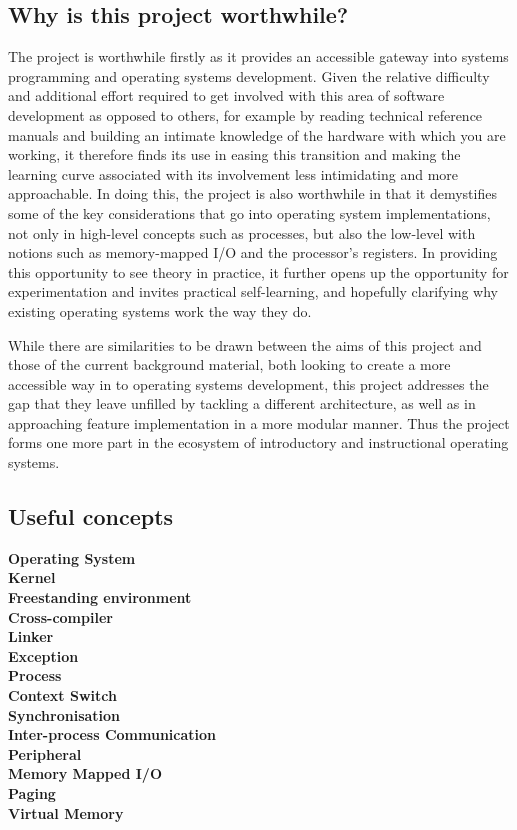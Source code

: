 \subsection{Why is this project worthwhile?}
    The project is worthwhile firstly as it provides an accessible gateway into
    systems programming and operating systems development. Given the relative
    difficulty and additional effort required to get involved with this area of
    software development as opposed to others, for example by reading technical
    reference manuals and building an intimate knowledge of the hardware with
    which you are working, it therefore finds its use in easing this transition
    and making the learning curve associated with its involvement less
    intimidating and more approachable. In doing this, the project is also
    worthwhile in that it demystifies some of the key considerations that go
    into operating system implementations, not only in high-level concepts such
    as processes, but also the low-level with notions such as memory-mapped I/O
    and the processor's registers. In providing this opportunity to see theory
    in practice, it further opens up the opportunity for experimentation and
    invites practical self-learning, and hopefully clarifying why existing
    operating systems work the way they do.

    While there are similarities to be drawn between the aims of this project
    and those of the current background material, both looking to create a more
    accessible way in to operating systems development, this project addresses
    the gap that they leave unfilled by tackling a different architecture, as
    well as in approaching feature implementation in a more modular manner. Thus
    the project forms one more part in the ecosystem of introductory and
    instructional operating systems.

\subsection{Useful concepts}
    \textbf{Operating System} \\
    \textbf{Kernel} \\
    \textbf{Freestanding environment} \\
    \textbf{Cross-compiler} \\
    \textbf{Linker} \\
    \textbf{Exception} \\
    \textbf{Process} \\
    \textbf{Context Switch} \\
    \textbf{Synchronisation} \\
    \textbf{Inter-process Communication} \\
    \textbf{Peripheral} \\
    \textbf{Memory Mapped I/O} \\
    \textbf{Paging} \\
    \textbf{Virtual Memory} \\

